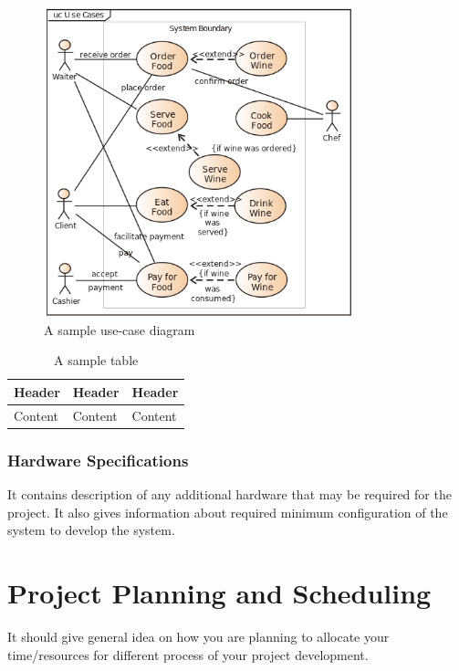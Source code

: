 \documentclass{projectreport}
\begin{document}
	\begin{figure}[h!]
		\centering
		\includegraphics[width=0.8\textwidth]{usecase}
		\caption{A sample use-case diagram}
		\label{fig:usecase}
	\end{figure}

	\begin{table}[h!]
		\caption{A sample table}
		\label{table:sample}
		\centering
		\begin{tabular}{|l|l|l|}
			\hline
			\textbf{Header} & \textbf{Header} & \textbf{Header}\\ \hline
			Content & Content & Content \\ \hline
		\end{tabular}
	\end{table}
	
	\subsection{Hardware Specifications}
	It contains description of any additional hardware that may be required for the project. It also gives information about required minimum configuration of the system to develop the system.
	
	
	\chapter{Project Planning and Scheduling}
	It should give general idea on how you are planning to allocate your time/resources for different process of your project development.
	
\end{document}

